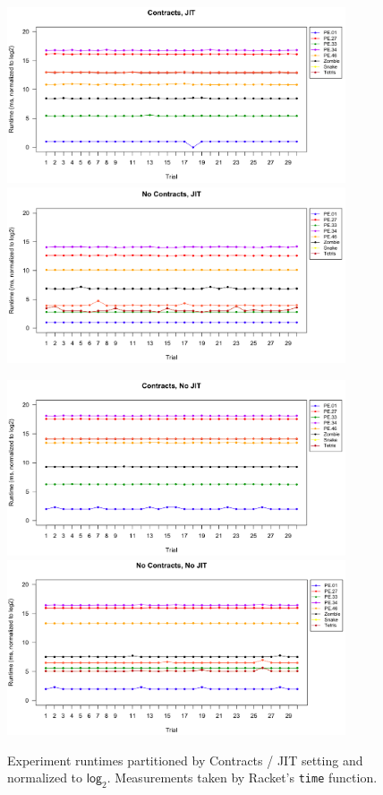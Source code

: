\begin{figure}[t]
  \begin{center}
  \vspace*{-2cm}\hspace*{-3.5cm}\includegraphics[width=10cm]{data/contracts-jit-runtime.png}\includegraphics[width=10cm]{data/nocontracts-jit-runtime.png}

  \vspace{1cm}\hspace*{-3.5cm}\includegraphics[width=10cm]{data/contracts-nojit-runtime.png}\includegraphics[width=10cm]{data/nocontracts-nojit-runtime.png}
  
  \caption{Experiment runtimes partitioned by Contracts / JIT setting and normalized to $\mathsf{log}_2$. Measurements taken by Racket's \texttt{time} function.}
  \label{trials}
  \end{center}
\end{figure}